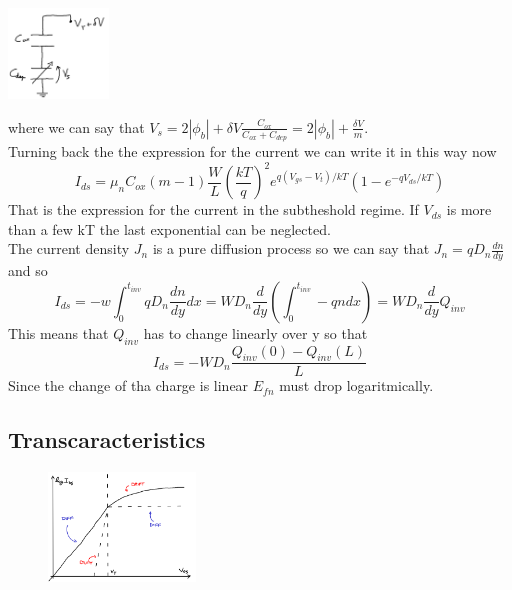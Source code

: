 \centering
\includegraphics[width=0.2\textwidth]{subth2.png}\\
\raggedright

where we can say that $V_s=2|\phi_b|+\delta V \frac{C_{ox}}{C_{ox}+C_{dep}}=2|\phi_b|+\frac{\delta V}{m}$.\\
Turning back the the expression for the current we can write it in this way now
\begin{equation}
I_{ds}=\mu_nC_{ox}(m-1)\frac{W}{L}(\frac{kT}{q})^2 e^{q(V_{gs}-V_t)/kT}\left(1-e^{-qV_{ds}/kT}\right)
\end{equation}
That is the expression for the current in the subtheshold regime. If $V_{ds}$ is more than a few kT the last exponential can be neglected.\\
The current density $J_n$ is a pure diffusion process so we can say that $J_n=qD_n \frac{dn}{dy}$ and so
\begin{equation}
I_{ds}=-w\int^{t_{inv}}_0qD_n \frac{dn}{dy}dx=WD_n \frac{d}{dy}\left(\int^{t_{inv}}_0 -qndx\right)=WD_n \frac{d}{dy}Q_{inv}
\end{equation}
This means that $Q_{inv}$ has to change linearly over y so that 
\begin{equation}
I_{ds}=-WD_n \frac{Q_{inv}(0)-Q_{inv}(L)}{L}
\end{equation}
Since the change of tha charge is linear $E_{fn}$ must drop logaritmically.\\


\subsection{Transcaracteristics}

\begin{figure}
\includegraphics[width=0.35\textwidth]{tranclog.png}
\end{figure}


